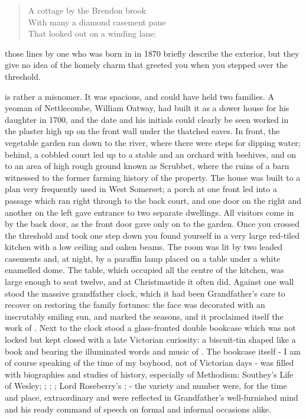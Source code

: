 \begin{quote}
A cottage by the Brendon brook \\
With many a diamond casement pane \\
That looked out on a winding lane:
\end{quote}

those lines by one who was born in  in 1870 briefly describe the exterior, but they give no idea of the homely charm that greeted you when you stepped over the threshold.

 is rather a misnomer. It was spacious, and could have held two families. A yeoman of Nettlecombe, William Oatway, had built it as a dower house for his daughter in 1700, and the date and his initials could clearly be seen worked in the plaster high up on the front wall under the thatched eaves. In front, the vegetable garden ran down to the river, where there were steps for dipping water; behind, a cobbled court led up to a stable and an orchard with beehives, and on to an area of high rough ground known as Scrubbet, where the ruins of a barn witnessed to the former farming  history of the property. The house was built to a plan very frequently used in West Somerset; a porch at one front led into a passage which ran right through to the back court, and one door on the right and another on the left gave entrance to two separate dwellings. All visitors come in by the back door, as the front door gave only on to the garden. Once you crossed the threshold and took one step down you found yourself in a very large red-tiled kitchen with a low ceiling and oaken beams. The room was lit by two leaded casements and, at night, by a paraffin lamp placed on a table under a white enamelled dome. The table, which occupied all the centre of the kitchen, was large enough to seat twelve, and at Christmastide it often did. Against one wall stood the massive grandfather clock, which it had been Grandfather’s care to recover on restoring the family fortunes: the face was decorated with an inscrutably smiling sun, and marked the seasons, and it proclaimed itself the work of . Next to the clock stood a glass-fronted double bookcase which was not locked but kept closed with a late Victorian curiosity: a biscuit-tin shaped like a book and bearing the illuminated words and music of . The bookcase itself - I am of course speaking of the time of my boyhood, not of Victorian days - was filled with biographies and studies of history, especially of Methodism: Southey’s Life of Wesley; ; ; ; Lord Roseberry's ;  - the variety and number were, for the time and place, extraordinary and were reflected in Grandfather's well-furnished mind and his ready command of speech on formal and informal occasions alike.


